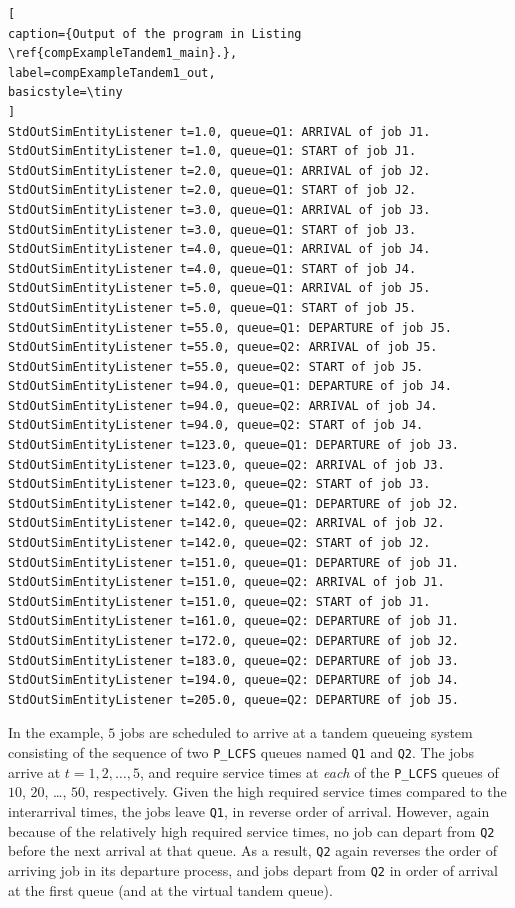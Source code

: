\documentclass[12pt]{book}
\begin{document}
\begin{lstlisting}[
caption={Output of the program in Listing \ref{compExampleTandem1_main}.},
label=compExampleTandem1_out,
basicstyle=\tiny
]
StdOutSimEntityListener t=1.0, queue=Q1: ARRIVAL of job J1.
StdOutSimEntityListener t=1.0, queue=Q1: START of job J1.
StdOutSimEntityListener t=2.0, queue=Q1: ARRIVAL of job J2.
StdOutSimEntityListener t=2.0, queue=Q1: START of job J2.
StdOutSimEntityListener t=3.0, queue=Q1: ARRIVAL of job J3.
StdOutSimEntityListener t=3.0, queue=Q1: START of job J3.
StdOutSimEntityListener t=4.0, queue=Q1: ARRIVAL of job J4.
StdOutSimEntityListener t=4.0, queue=Q1: START of job J4.
StdOutSimEntityListener t=5.0, queue=Q1: ARRIVAL of job J5.
StdOutSimEntityListener t=5.0, queue=Q1: START of job J5.
StdOutSimEntityListener t=55.0, queue=Q1: DEPARTURE of job J5.
StdOutSimEntityListener t=55.0, queue=Q2: ARRIVAL of job J5.
StdOutSimEntityListener t=55.0, queue=Q2: START of job J5.
StdOutSimEntityListener t=94.0, queue=Q1: DEPARTURE of job J4.
StdOutSimEntityListener t=94.0, queue=Q2: ARRIVAL of job J4.
StdOutSimEntityListener t=94.0, queue=Q2: START of job J4.
StdOutSimEntityListener t=123.0, queue=Q1: DEPARTURE of job J3.
StdOutSimEntityListener t=123.0, queue=Q2: ARRIVAL of job J3.
StdOutSimEntityListener t=123.0, queue=Q2: START of job J3.
StdOutSimEntityListener t=142.0, queue=Q1: DEPARTURE of job J2.
StdOutSimEntityListener t=142.0, queue=Q2: ARRIVAL of job J2.
StdOutSimEntityListener t=142.0, queue=Q2: START of job J2.
StdOutSimEntityListener t=151.0, queue=Q1: DEPARTURE of job J1.
StdOutSimEntityListener t=151.0, queue=Q2: ARRIVAL of job J1.
StdOutSimEntityListener t=151.0, queue=Q2: START of job J1.
StdOutSimEntityListener t=161.0, queue=Q2: DEPARTURE of job J1.
StdOutSimEntityListener t=172.0, queue=Q2: DEPARTURE of job J2.
StdOutSimEntityListener t=183.0, queue=Q2: DEPARTURE of job J3.
StdOutSimEntityListener t=194.0, queue=Q2: DEPARTURE of job J4.
StdOutSimEntityListener t=205.0, queue=Q2: DEPARTURE of job J5.
\end{lstlisting}

In the example, $5$ jobs are scheduled to arrive at
  a tandem queueing system consisting of
  the sequence of
  two \lstinline|P_LCFS| queues
  named
  \lstinline|Q1| and \lstinline|Q2|.
The jobs arrive at $t=1, 2, \dots, 5$,
  and require service times at {\em each\/} of the \lstinline|P_LCFS| queues
  of $10$, $20$, \ldots, $50$, respectively.
Given the high required service times compared to the
  interarrival times,
  the jobs leave \lstinline|Q1|,
  in reverse order of arrival.
However, again because of the relatively high required service times,
  no job can depart from \lstinline|Q2| before the next arrival
  at that queue.
As a result,
  \lstinline|Q2| again reverses the order of arriving job in its departure
  process, and jobs depart from \lstinline|Q2| in order of arrival at the first queue
  (and at the virtual tandem queue).
\end{document}
